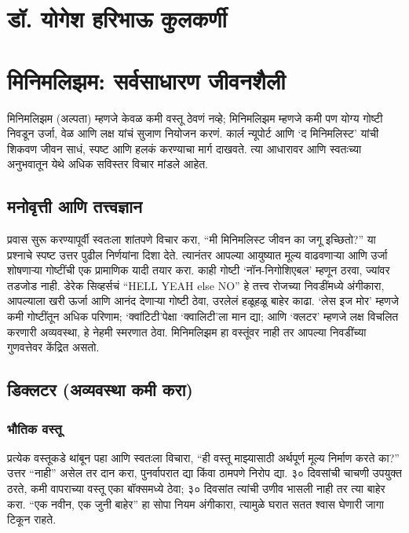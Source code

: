 \chapter*{डॉ. योगेश हरिभाऊ कुलकर्णी}

\chapter{मिनिमलिझम: सर्वसाधारण जीवनशैली}

मिनिमलिझम (अल्पता) म्हणजे केवळ कमी वस्तू ठेवणं नव्हे; मिनिमलिझम म्हणजे कमी पण योग्य गोष्टी निवडून उर्जा, वेळ आणि लक्ष यांचं सुजाण नियोजन करणं. कार्ल न्यूपोर्ट आणि ‘द मिनिमलिस्ट’ यांची शिकवण जीवन साधं, स्पष्ट आणि हलकं करण्याचा मार्ग दाखवते. त्या आधारावर आणि स्वतःच्या अनुभवातून येथे अधिक सविस्तर विचार मांडले आहेत.

\section*{मनोवृत्ती आणि तत्त्वज्ञान}

प्रवास सुरू करण्यापूर्वी स्वतःला शांतपणे विचार करा, “मी मिनिमलिस्ट जीवन का जगू इच्छितो?” या प्रश्नाचे स्पष्ट उत्तर पुढील निर्णयांना दिशा देते. त्यानंतर आपल्या आयुष्यात मूल्य वाढवणाऱ्या आणि उर्जा शोषणाऱ्या गोष्टींची एक प्रामाणिक यादी तयार करा. काही गोष्टी ‘नॉन-निगोशिएबल’ म्हणून ठरवा, ज्यांवर तडजोड नाही. डेरेक सिव्हर्सचं “HELL YEAH else NO” हे तत्त्व रोजच्या निवडींमध्ये अंगीकारा, आपल्याला खरी ऊर्जा आणि आनंद देणाऱ्या गोष्टी ठेवा, उरलेलं हळूहळू बाहेर काढा. ‘लेस इज मोर’ म्हणजे कमी गोष्टींतून अधिक परिणाम; ‘क्वांटिटी’पेक्षा ‘क्वालिटी’ला मान द्या; आणि ‘क्लटर’ म्हणजे लक्ष विचलित करणारी अव्यवस्था, हे नेहमी स्मरणात ठेवा. मिनिमलिझम हा वस्तूंवर नाही तर आपल्या निवडींच्या गुणवत्तेवर केंद्रित असतो.

\section*{डिक्लटर (अव्यवस्था कमी करा)}

\subsection*{भौतिक वस्तू}

प्रत्येक वस्तूकडे थांबून पहा आणि स्वतःला विचारा, “ही वस्तू माझ्यासाठी अर्थपूर्ण मूल्य निर्माण करते का?” उत्तर “नाही” असेल तर दान करा, पुनर्वापरात द्या किंवा ठामपणे निरोप द्या. ३० दिवसांची चाचणी उपयुक्त ठरते, कमी वापराच्या वस्तू एका बॉक्समध्ये ठेवा; ३० दिवसांत त्यांची उणीव भासली नाही तर त्या बाहेर करा. “एक नवीन, एक जुनी बाहेर” हा सोपा नियम अंगीकारा, त्यामुळे घरात सतत श्वास घेणारी जागा टिकून राहते.

